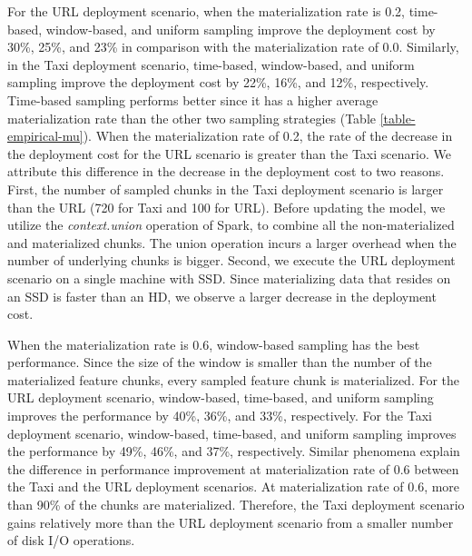 For the URL deployment scenario, when the materialization rate is 0.2, time-based, window-based, and uniform sampling improve the deployment cost by 30\%, 25\%, and 23\% in comparison with the materialization rate of 0.0.
Similarly, in the Taxi deployment scenario, time-based, window-based, and uniform sampling improve the deployment cost by 22\%, 16\%, and 12\%, respectively. 
Time-based sampling performs better since it has a higher average materialization rate than the other two sampling strategies (Table \ref{table-empirical-mu}).
When the materialization rate of 0.2, the rate of the decrease in the deployment cost for the URL scenario is greater than the Taxi scenario.
We attribute this difference in the decrease in the deployment cost to two reasons.
First, the number of sampled chunks in the Taxi deployment scenario is larger than the URL (720 for Taxi and 100 for URL).
Before updating the model, we utilize the \textit{context.union} operation of Spark, to combine all the non-materialized and materialized chunks.
The union operation incurs a larger overhead when the number of underlying chunks is bigger.
Second, we execute the URL deployment scenario on a single machine with SSD.
Since materializing data that resides on an SSD is faster than an HD, we observe a larger decrease in the deployment cost.

When the materialization rate is 0.6, window-based sampling has the best performance.
Since the size of the window is smaller than the number of the materialized feature chunks, every sampled feature chunk is materialized.
For the URL deployment scenario, window-based, time-based, and uniform sampling improves the performance by 40\%, 36\%, and 33\%, respectively.
For the Taxi deployment scenario, window-based, time-based, and uniform sampling improves the performance by 49\%, 46\%, and 37\%, respectively.
Similar phenomena explain the difference in performance improvement at materialization rate of 0.6 between the Taxi and the URL deployment scenarios.
At materialization rate of 0.6, more than 90\% of the chunks are materialized.
Therefore, the Taxi deployment scenario gains relatively more than the URL deployment scenario from a smaller number of disk I/O operations.

